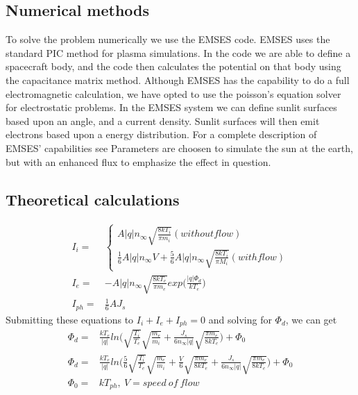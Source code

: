 \subsection{Numerical methods}

To solve the problem numerically we use the EMSES code. EMSES uses the standard PIC method for plasma simulations.
In the code we are able to define a spacecraft body, and the code then calculates the potential on that body using the capacitance matrix method.
Although EMSES has the capability to do a full electromagnetic calculation, we have opted to use the poisson's equation
solver for electrostatic problems. In the EMSES system we can define sunlit surfaces based upon an angle, and a current
density. Sunlit surfaces will then emit electrons based upon a energy distribution. For a complete description of EMSES' capabilities
see \citep{nakashima_ohhelp:_2009} Parameters are choosen to simulate the sun at the earth, but with an enhanced flux to emphasize the effect in question.

\subsection{Theoretical calculations}

\begin{equation}
\begin{split}
 I_i = &
    \left\{\begin{array}{ccc}
       A|q|n_\infty\sqrt{\frac{8 k T_i}{\pi m_i}} (without flow)\\
       \frac{1}{6}A |q|n_\infty V + \frac{5}{6} A |q| n_\infty \sqrt{\frac{8 k T_i}{\pi M_i}}(with flow)
      \end{array}\right. \\
  I_e = & -A|q|n_\infty \sqrt{\frac{8 k T_e}{\pi m_e}}exp\Big(\frac{|q|\Phi_d}{k T_e}\Big)\\
  I_{ph} = & \frac{1}{6} AJ_s
\end{split}
\label{thin sheet potential}
\end{equation}
Submitting these equations to \(I_i+I_e+I_{ph}=0\) and solving for $\Phi_d$, we can get
\begin{equation}
\begin{split}
 \Phi_d = & \frac{k T_e}{|q|}ln\Big(\sqrt{\frac{T_i}{T_e}}\sqrt{\frac{m_e}{m_i}}+\frac{J_s}{6 n_\infty |q|}\sqrt{\frac{\pi m_e}{8 k T_e}}\Big) + \Phi_0 \\
 \Phi_d = & \frac{k T_e}{|q|}ln\Big(\frac{5}{6}\sqrt{\frac{T_i}{T_e}}\sqrt{\frac{m_e}{m_i}}+\frac{V}{6}\sqrt{\frac{\pi m_e}{8 k T_e}} + \frac{J_s}{6 n_\infty |q|}\sqrt{\frac{\pi m_e}{8 k T_e}} \Big)+\Phi_0 \\
 \Phi_0 = & k T_{ph}, \ V = speed\ of\ flow
\end{split}
\label{thin sheet potential 2}
\end{equation}

